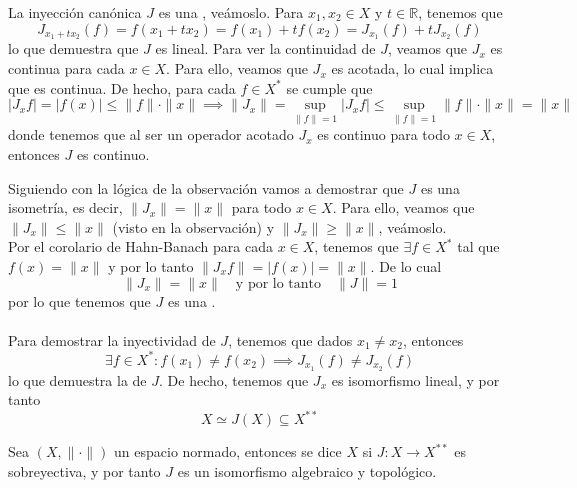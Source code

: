 \begin{observacion}
    La inyección canónica $J$ es una , veámoslo. Para $x_1, x_2 \in X$ y $t \in \mathbb{R}$, tenemos que
    \begin{equation*}
        J_{x_1 + t x_2}(f) = f(x_1 + t x_2) = f(x_1) + t f(x_2) = J_{x_1}(f) + t J_{x_2}(f)
    \end{equation*}
    lo que demuestra que $J$ es lineal. Para ver la continuidad de $J$, veamos que $J_x$ es continua para cada $x \in X$. Para ello, veamos que $J_x$ es acotada, lo cual implica que es continua. De hecho, para cada $f \in X^*$ se cumple que
    \begin{equation*}
        |J_x f| = |f(x)| \leq \|f\| \cdot \|x\| \implies \|J_x\| = \sup_{\|f\|=1} |J_x f| \leq \sup_{\|f\|=1} \|f\| \cdot \|x\| = \|x\|
    \end{equation*}
    donde tenemos que al ser un operador acotado $J_x$ es continuo para todo $x \in X$, entonces $J$ es continuo. \\
\end{observacion}

\noindent
Siguiendo con la lógica de la observación vamos a demostrar que $J$ es una isometría, es decir, $\|J_x\| = \|x\|$ para todo $x \in X$. Para ello, veamos que $\|J_x\| \leq \|x\|$ (visto en la observación) y $\|J_x\| \geq \|x\|$, veámoslo. \\
\noindent
Por el corolario de Hahn-Banach para cada $x\in X$, tenemos que $\exists f \in X^*$ tal que $f(x) = \|x\|$ y por lo tanto $\|J_x f\| = |f(x)| = \|x\|$. De lo cual
\begin{equation*}
    \|J_x\| = \|x\| \quad \text{y por lo tanto} \quad \|J\| = 1
\end{equation*}
por lo que tenemos que $J$ es una .  \\ \\
\noindent 
Para demostrar la inyectividad de $J$, tenemos que dados $x_1 \neq x_2$, entonces 
\begin{equation*}
    \exists f \in X^* : f(x_1) \neq f(x_2) \implies J_{x_1}(f) \neq J_{x_2}(f)
\end{equation*}
lo que demuestra la  de $J$. De hecho, tenemos que $J_x$ es isomorfismo lineal, y por tanto 
\begin{equation*}
    X\simeq J(X) \subseteq X^{**}
\end{equation*}

\begin{definicion}
    Sea $(X, \|\cdot\|)$ un espacio normado, entonces se dice $X$  si $J: X \to X^{**}$ es sobreyectiva, y por tanto $J$ es un isomorfismo algebraico y topológico.
\end{definicion}


